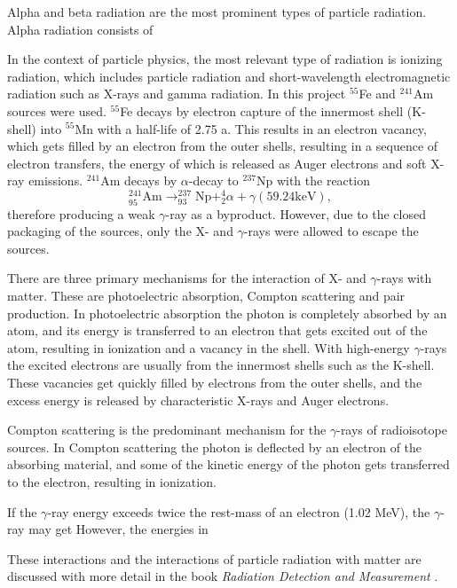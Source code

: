 \documentclass[a4paper]{article}
\begin{document}
Alpha and beta radiation are the most prominent types of particle radiation.
Alpha radiation consists of 
\fi

In the context of particle physics, the most relevant type of radiation is ionizing radiation, which includes particle radiation and short-wavelength electromagnetic radiation such as X-rays and gamma radiation.
In this project $^{55}$Fe and $^{241}$Am sources were used.
$^{55}$Fe decays by electron capture of the innermost shell (K-shell) into $^{55}$Mn with a half-life of 2.75 a.
This results in an electron vacancy, which gets filled by an electron from the outer shells, resulting in a sequence of electron transfers, the energy of which is released as Auger electrons and soft X-ray emissions.
$^{241}$Am decays by $\alpha$-decay to $^{237}$Np with the reaction
\begin{equation}
^{241}_{95}\text{Am} \rightarrow ^{237}_{93}\text{Np} + ^4_2 \alpha + \gamma (59.24 \text{keV}),
\end{equation}
therefore producing a weak $\gamma$-ray as a byproduct.
However, due to the closed packaging of the sources, only the X- and $\gamma$-rays were allowed to escape the sources.
\cite{winkler_gaseous_2015}

There are three primary mechanisms for the interaction of X- and $\gamma$-rays with matter.
These are photoelectric absorption, Compton scattering and pair production.
In photoelectric absorption the photon is completely absorbed by an atom, and its energy is transferred to an electron that gets excited out of the atom, resulting in ionization and a vacancy in the shell.
With high-energy $\gamma$-rays the excited electrons are usually from the innermost shells such as the K-shell.
These vacancies get quickly filled by electrons from the outer shells, and the excess energy is released by characteristic X-rays and Auger electrons.

Compton scattering is the predominant mechanism for the $\gamma$-rays of radioisotope sources.
In Compton scattering the photon is deflected by an electron of the absorbing material, and some of the kinetic energy of the photon gets transferred to the electron, resulting in ionization.

If the $\gamma$-ray energy exceeds twice the rest-mass of an electron (1.02 MeV), the $\gamma$-ray may get
However, the energies in 



These interactions and the interactions of particle radiation with matter are discussed with more detail in the book \textit{Radiation Detection and Measurement} \cite{knoll_radiation_2010}.
\end{document}
